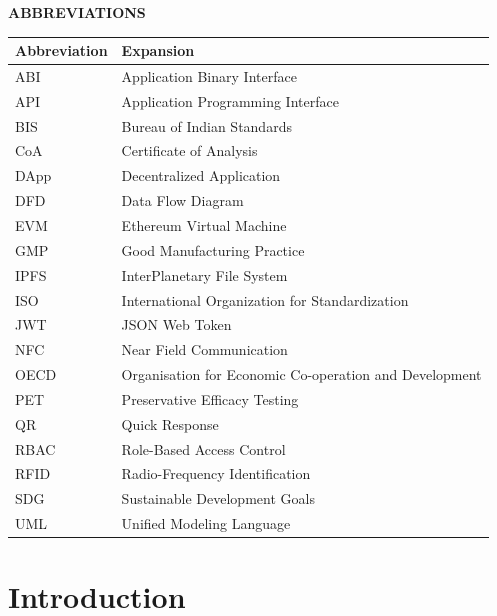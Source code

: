 \documentclass[12pt,a4paper]{report}
\begin{document}
\newpage
\thispagestyle{plain}
\begin{center}
    {\Large \textbf{ABBREVIATIONS}\par}
\end{center}
\vspace{0.5cm}
\noindent
\begin{table}[H]
\centering
\begin{tabularx}{\textwidth}{l X}
\toprule
\textbf{Abbreviation} & \textbf{Expansion} \\
\midrule
ABI & Application Binary Interface \\
API & Application Programming Interface \\
BIS & Bureau of Indian Standards \\
CoA & Certificate of Analysis \\
DApp & Decentralized Application \\
DFD & Data Flow Diagram \\
EVM & Ethereum Virtual Machine \\
GMP & Good Manufacturing Practice \\
IPFS & InterPlanetary File System \\
ISO & International Organization for Standardization \\
JWT & JSON Web Token \\
NFC & Near Field Communication \\
OECD & Organisation for Economic Co-operation and Development \\
PET & Preservative Efficacy Testing \\
QR & Quick Response \\
RBAC & Role-Based Access Control \\
RFID & Radio-Frequency Identification \\
SDG & Sustainable Development Goals \\
UML & Unified Modeling Language \\
\bottomrule
\end{tabularx}
\end{table}

\newpage
{}
\setcounter{page}{1}

\chapter{Introduction}
\end{document}
